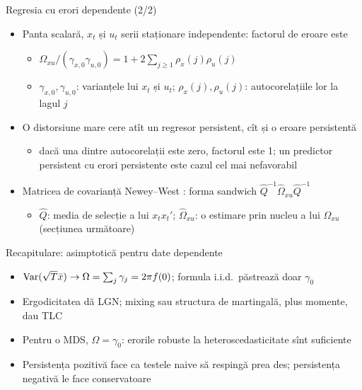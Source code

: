 \begin{frame}{Regresia cu erori dependente (2/2)}
\itemsize{\small}
\begin{itemize}
    \item Panta scalară, $x_t$ și $u_t$ serii staționare independente: factorul de eroare este
    \begin{itemize}
        \item $\Omega_{xu}/(\gamma_{x,0}\gamma_{u,0}) = 1 + 2\sum_{j\ge 1}\rho_{x}(j)\rho_{u}(j)$
        \item $\gamma_{x,0}, \gamma_{u,0}$: varianțele lui $x_t$ și $u_t$; $\rho_x(j), \rho_u(j)$: autocorelațiile lor la lagul $j$
    \end{itemize}
    \item O distorsiune mare cere atît un regresor persistent, cît și o eroare persistentă
    \begin{itemize}
        \item dacă una dintre autocorelații este zero, factorul este 1; un predictor persistent cu erori persistente este cazul cel mai nefavorabil
    \end{itemize}
    \item Matricea de covarianță Newey--West : forma sandwich $\hat Q^{-1}\hat\Omega_{xu}\hat Q^{-1}$
    \begin{itemize}
        \item $\hat Q$: media de selecție a lui $x_tx_t'$; $\hat\Omega_{xu}$: o estimare prin nucleu a lui $\Omega_{xu}$ (secțiunea următoare)
    \end{itemize}
\end{itemize}
\end{frame}

\begin{frame}{Recapitulare: asimptotică pentru date dependente}
\itemsize{\small}
\begin{itemize}
    \item $\text{Var}(\sqrt{T}\bar x) \to \Omega = \sum_j\gamma_j = 2\pi f(0)$; formula i.i.d.\ păstrează doar $\gamma_0$
    \item Ergodicitatea dă LGN; mixing sau structura de martingală, plus momente, dau TLC
    \item Pentru o MDS, $\Omega = \gamma_0$: erorile robuste la heteroscedasticitate sînt suficiente
    \item Persistența pozitivă face ca testele naive să respingă prea des; persistența negativă le face conservatoare
\end{itemize}
\end{frame}


